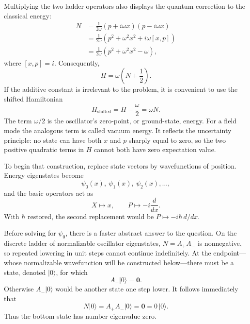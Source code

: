 Multiplying the two ladder operators also displays the quantum correction to the classical energy:
\begin{align}
N
&=\frac{1}{2\omega}(p+i\omega x)(p-i\omega x)\\
&=\frac{1}{2\omega}\left(p^{2}+\omega^{2}x^{2}
 +i\omega[x,p]\right)\\
&=\frac{1}{2\omega}\left(p^{2}+\omega^{2}x^{2}-\omega\right),
\end{align}
where \([x,p]=i\). Consequently,
\begin{equation}
H=\omega\left(N+\frac12\right).
\end{equation}
If the additive constant is irrelevant to the problem, it is convenient to use the shifted Hamiltonian
\begin{equation}
H_{\mathrm{shifted}}=H-\frac{\omega}{2}=\omega N.
\end{equation}
The term \(\omega/2\) is the oscillator's zero-point, or ground-state, energy. For a field mode the analogous term is called vacuum energy. It reflects the uncertainty principle: no state can have both \(x\) and \(p\) sharply equal to zero, so the two positive quadratic terms in \(H\) cannot both have zero expectation value.

\begin{classroomqa}
\end{classroomqa}

To begin that construction, replace state vectors by wavefunctions of position. Energy eigenstates become
\[
\psi_{0}(x),\ \psi_{1}(x),\ \psi_{2}(x),\ldots,
\]
and the basic operators act as
\begin{equation}
X\longmapsto x,\qquad
P\longmapsto -i\frac{d}{dx}.
\end{equation}
With \(\hbar\) restored, the second replacement would be
\(P\mapsto-i\hbar\,d/dx\).

Before solving for \(\psi_{0}\), there is a faster abstract answer to the question. On the discrete ladder of normalizable oscillator eigenstates, \(N=A_{+}A_{-}\) is nonnegative, so repeated lowering in unit steps cannot continue indefinitely. At the endpoint---whose normalizable wavefunction will be constructed below---there must be a state, denoted \(\lvert0\rangle\), for which
\begin{equation}
A_{-}\lvert0\rangle=\mathbf 0.
\end{equation}
Otherwise \(A_{-}\lvert0\rangle\) would be another state one step lower. It follows immediately that
\begin{equation}
N\lvert0\rangle
=A_{+}A_{-}\lvert0\rangle
=\mathbf 0
=0\,\lvert0\rangle.
\end{equation}
Thus the bottom state has number eigenvalue zero.


